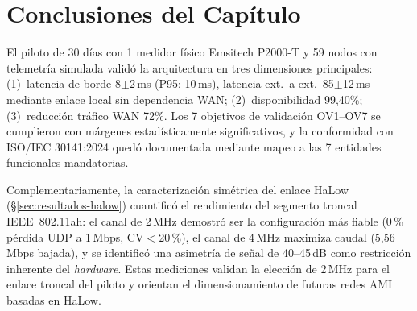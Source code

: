\section{Conclusiones del Capítulo}
\label{sec:resultados-conclusiones}

El piloto de 30 días con 1 medidor físico Emsitech P2000-T y 59 nodos con telemetría simulada validó la arquitectura en tres dimensiones principales: (1)~latencia de borde 8$\pm$2\,ms (P95: 10\,ms), latencia ext.\ a ext.\ 85$\pm$12\,ms mediante enlace local sin dependencia WAN; (2)~disponibilidad 99,40\%; (3)~reducción tráfico WAN 72\%. Los 7 objetivos de validación OV1--OV7 se cumplieron con márgenes estadísticamente significativos, y la conformidad con ISO/IEC 30141:2024 quedó documentada mediante mapeo a las 7 entidades funcionales mandatorias.

Complementariamente, la caracterización simétrica del enlace HaLow (§\ref{sec:resultados-halow}) cuantificó el rendimiento del segmento troncal IEEE~802.11ah: el canal de 2\,MHz demostró ser la configuración más fiable (0\,\% pérdida UDP a 1\,Mbps, CV$<$20\,\%), el canal de 4\,MHz maximiza caudal (5,56\,Mbps bajada), y se identificó una asimetría de señal de 40--45\,dB como restricción inherente del \emph{hardware}. Estas mediciones validan la elección de 2\,MHz para el enlace troncal del piloto y orientan el dimensionamiento de futuras redes AMI basadas en HaLow.
